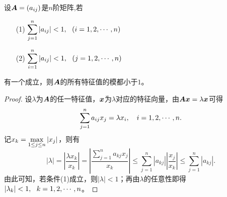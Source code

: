 \begin{frame}
  
  \begin{dingli}
    设$\boldsymbol{A}=(a_{ij})$是$n$阶矩阵,若
    \begin{itemize}
    \item[(1)] $\displaystyle \sum_{j=1}^n|a_{ij}|<1, ~~(i=1,2,\cdots,n)$
    \item[(2)] $\displaystyle \sum_{i=1}^n|a_{ij}|<1, ~~(j=1,2,\cdots,n)$
    \end{itemize}
    有一个成立，则$\boldsymbol{A}$的所有特征值的模都小于$1$。
  \end{dingli}\vspace{.1in}\pause 

  \begin{proof}
    设$\lambda$为$\boldsymbol{A}$的任一特征值，${\boldsymbol{x}}$为$\lambda$对应的特征向量，由$\boldsymbol{A}{\boldsymbol{x}}=\lambda{\boldsymbol{x}}$可得
    $$
    \sum_{j=1}^n a_{ij} x_j = \lambda x_i, \quad i=1,2,\cdots,n.
    $$
    记$\displaystyle x_k=\max_{1\le j\le n} |x_j|$，则有
    $$
    |\lambda|=\left|\frac{\lambda x_k}{x_k}\right|=\left|\frac{\sum_{j=1}^n a_{kj} x_j}{x_k}\right|
    \le \sum_{j=1}^n |a_{kj}| \left|\frac{x_j}{x_k}\right|\le \sum_{j=1}^n |a_{kj}|.
    $$
    由此可知，若条件(1)成立，则$|\lambda|<1$；再由$\lambda$的任意性即得$|\lambda_k|<1,~~k=1,2,\cdots,n$。 

    \pause\vspace{.1in}
 
  \end{proof}
  
\end{frame}

